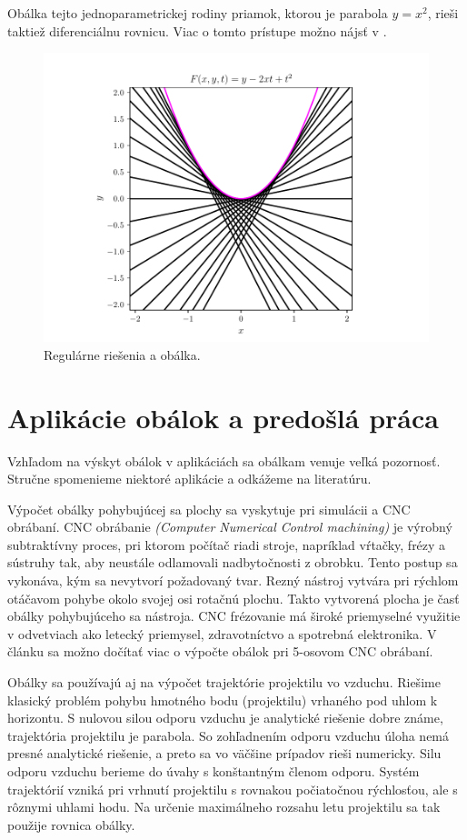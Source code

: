 Obálka tejto jednoparametrickej rodiny priamok, ktorou je parabola $y = x^2$, rieši taktiež diferenciálnu rovnicu. Viac o tomto prístupe možno nájsť v \cite{Gro97}.

\begin{figure}[H]
	\centering
	\includegraphics{images/odr.pdf}
	\caption{Regulárne riešenia a obálka.}
	\label{fig:odr}
\end{figure}

\section{Aplikácie obálok a predošlá práca}
Vzhľadom na výskyt obálok v aplikáciách sa obálkam venuje veľká pozornosť. Stručne spomenieme niektoré aplikácie a odkážeme na literatúru. 

Výpočet obálky pohybujúcej sa plochy sa vyskytuje pri simulácii a CNC obrábaní. CNC obrábanie \textit{(Computer Numerical Control machining)}  je výrobný subtraktívny proces, pri ktorom počítač riadi stroje, napríklad vŕtačky, frézy a sústruhy tak, aby neustále odlamovali nadbytočnosti z obrobku. Tento postup sa vykonáva, kým sa nevytvorí požadovaný tvar. Rezný nástroj vytvára pri rýchlom otáčavom pohybe okolo svojej osi rotačnú plochu. Takto vytvorená plocha je časť obálky pohybujúceho sa nástroja. CNC frézovanie má široké priemyselné využitie v odvetviach ako letecký priemysel, zdravotníctvo a spotrebná elektronika. V článku \cite{Skop20} sa možno dočítať viac o výpočte obálok pri 5-osovom CNC obrábaní.  

Obálky sa používajú aj na výpočet trajektórie projektilu vo vzduchu. Riešime klasický problém pohybu hmotného bodu (projektilu) vrhaného pod uhlom k horizontu. S nulovou silou odporu vzduchu je analytické riešenie dobre známe, trajektória projektilu je parabola. So zohľadnením odporu vzduchu úloha nemá presné analytické riešenie, a preto sa vo väčšine prípadov rieši numericky. Silu odporu vzduchu berieme do úvahy s konštantným členom odporu. Systém trajektórií vzniká pri vrhnutí projektilu s rovnakou počiatočnou rýchlosťou, ale s rôznymi uhlami hodu. Na určenie maximálneho rozsahu letu projektilu sa tak použije rovnica obálky. \cite{Chud09}

